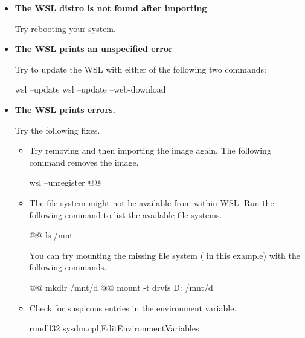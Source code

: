 \begin{itemize}
  \item {\bf The WSL distro is not found after importing}

    Try rebooting your system.
  \item {\bf The WSL prints an unspecified error}

    Try to update the WSL with either of the following two commands:
  \begin{monobox}
wsl --update
wsl --update --web-download
\end{monobox}
  \item {\bf The WSL prints  errors.}

    Try the following fixes.
    \begin{itemize}
      \item Try removing and then importing the image again.
        The following command removes the image.
        \begin{monobox}
wsl --unregister @\imagename{}@
\end{monobox}
      \item The file system might not be available from within WSL.
        Run the following command to list the available file systems.
        \begin{monobox}
@\cmdinwsl{}@ ls /mnt
\end{monobox}
        You can try mounting the missing file system ( in this example) with the following commands.
        \begin{monobox}
@\cmdinwsl{}@ mkdir /mnt/d
@\cmdinwsl{}@ mount -t drvfs D: /mnt/d
\end{monobox}
      \item Check for suspicous entries in the  environment variable.
        \begin{monobox}
rundll32 sysdm.cpl,EditEnvironmentVariables
\end{monobox}
    \end{itemize}
\end{itemize}
